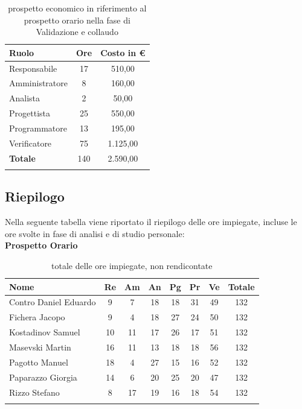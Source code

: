 \documentclass[../piano_di_progetto.tex]{subfiles}
\begin{document}
\begin{center}
	\begin{longtable}{|l|c|c|}
		\hline
		\rowcolor{lightgray}
		\textbf{Ruolo} & \textbf{Ore} & \textbf{Costo in €}\\

		\hline
		Responsabile & 17 & 510,00\\
		Amministratore & 8 & 160,00\\
		Analista & 2 & 50,00\\
		Progettista & 25 & 550,00\\
		Programmatore & 13 & 195,00\\
		Verificatore & 75 & 1.125,00\\
		\textbf{Totale} & 140 & 2.590,00\\
		\hline
		\caption{prospetto economico in riferimento al prospetto orario nella fase di Validazione e collaudo}
	\end{longtable}
\end{center}

\newpage

\subsection{Riepilogo}%
\label{sub:riepilog}
Nella seguente tabella viene riportato il riepilogo delle ore impiegate, incluse le ore svolte in fase di analisi e di studio personale: \\

\textbf{Prospetto Orario}

\begin{center}
	\begin{longtable}{|l|c|c|c|c|c|c|c|}
		\hline
		\rowcolor{lightgray}
		\textbf{Nome} & \textbf{Re} & \textbf{Am} & \textbf{An} & \textbf{Pg}  & \textbf{Pr}   & \textbf{Ve} & \textbf{Totale} \\

		\hline
			Contro Daniel Eduardo & 9 & 7 & 18 & 18 & 31 & 49 & 132 \\
			Fichera Jacopo & 9 & 4 & 18 & 27 & 24 & 50 & 132 \\
			Kostadinov Samuel & 10 & 11 & 17 & 26 & 17 & 51 & 132 \\
			Masevski Martin & 16 & 11 & 13 & 18 & 18 & 56 & 132 \\
			Pagotto Manuel & 18 & 4 & 27 & 15 & 16 & 52 & 132 \\		
			Paparazzo Giorgia & 14 & 6 & 20 & 25 & 20 & 47 & 132 \\
			Rizzo Stefano & 8 & 17 & 19 & 16 & 18 & 54 & 132 \\
		\hline	
		\rowcolor{white}
		\caption{totale delle ore impiegate, non rendicontate}
	\end{longtable}
\end{center}
\end{document}
